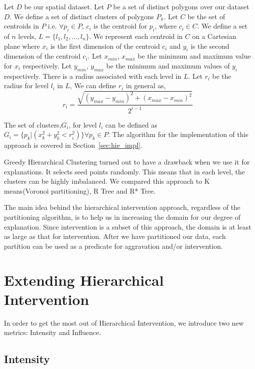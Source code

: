 Let $D$ be our spatial dataset. Let $P$ be a set of distinct polygons over our dataset $D$. We define a set of distinct clusters of polygons $P_h$. Let $C$ be the set of centroids in $P$ i.e. $\forall p_i \in P$, $c_i$ is the centroid for $p_i$, where $c_i \in C$. We define a set of $n$ levels, $L = \{l_1, l_2,...,l_n\}$. We represent each centroid in $C$ on a Cartesian plane where $x_i$ is the first dimension of the centroid $c_i$ and $y_i$ is the second dimension of the centroid $c_i$. Let $x_{min}$, $x_{max}$ be the minimum and maximum value for $x_i$ respectively. Let $y_{min}$, $y_{max}$ be the minimum and maximum values of $y_i$ respectively. There is a radius associated with each level in $L$. Let $r_i$ be the radius for level $l_i$ in $L$, We can define $r_i$ in general as,
$$r_i = \frac{\sqrt{(y_{max}-y_{min})^2+(x_{max}-x_{min})^2}}{2^{i-1}}$$

The set of clusters,$G_i$, for level $l_i$ can be defined as $G_i=\{p_k|(x_k^2 + y_k^2 < r_i^2)\}\forall p_k \in P$. The algorithm for the implementation of this approach is covered in Section~\ref{sec:hie_impl}.

Greedy Hierarchical Clustering turned out to have a drawback when we use it for explanations. It selects seed points randomly. This means that in each level, the clusters can be highly imbalanced. We compared this approach to K means(Voronoi partitioning)\citep{hartigan1979algorithm,aurenhammer2000voronoi}, R Tree\citep{guttman1984r} and R* Tree\citep{beckmann1990r}.

The main idea behind the hierarchical intervention approach, regardless of the partitioning algorithm, is to help us in increasing the domain for our degree of explanation. Since intervention is a subset of this approach, the domain is at least as large as that for intervention. After we have partitioned our data, each partition can be used as a predicate for aggravation and/or intervention.

\section{Extending Hierarchical Intervention}
\label{sec:extending_hi}

In order to get the most out of Hierarchical Intervention, we introduce two new metrics: Intensity and Influence.

\subsection{Intensity}
\label{sec:intensity}

